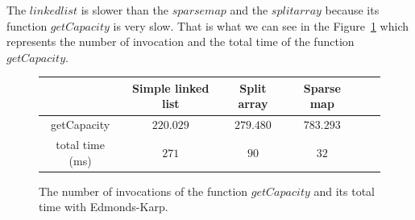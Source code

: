 The $linkedlist$ is slower than the $sparsemap$ and the $splitarray$ because its function $getCapacity$ is very slow. That is what we can see in the Figure~\ref{fig:ekcapa} which represents the number of invocation and the total time of the function $getCapacity$.
\begin{figure}[h]
\centering
\begin{tabular}{|c|c|c|c|c|c|}
	\hline
     & \textbf{Simple linked list} & \textbf{Split array} & \textbf{Sparse map}\\
     \hline	
   getCapacity & $220.029$ & $279.480$ & $783.293$ \\
   total time (ms) & $271$ & $90$ & $32$ \\
   \hline
\end{tabular}
\caption{The number of invocations of the function $getCapacity$ and its total time with Edmonds-Karp.}
\label{fig:ekcapa}
\end{figure}
